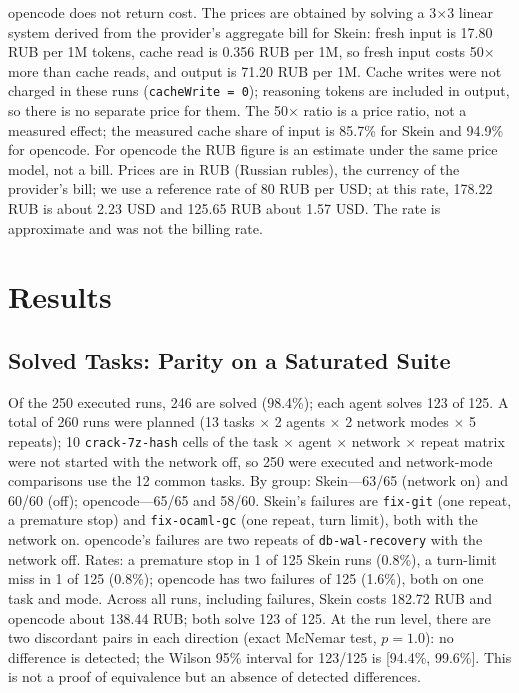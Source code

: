 \documentclass[11pt,a4paper]{article}
\begin{document}
opencode does not return cost. The prices are obtained by solving a 3$\times$3 linear system derived from the provider's
aggregate bill for Skein: fresh
input is 17.80 RUB per 1M tokens, cache read is 0.356 RUB per 1M, so fresh input costs 50$\times$ more than
cache reads, and output is 71.20 RUB per 1M. Cache writes were not charged in these runs
(\texttt{cacheWrite = 0}); reasoning tokens are included in output, so there is no separate
price for them. The 50$\times$ ratio is a price ratio, not a measured effect; the measured cache
share of input is 85.7\% for Skein and 94.9\% for opencode. For opencode the RUB figure is an
estimate under the same price model, not a bill. Prices are in RUB (Russian rubles), the
currency of the provider's bill; we use a reference rate of 80 RUB per USD; at this rate, 178.22 RUB is about
2.23 USD and 125.65 RUB about 1.57 USD. The rate is approximate and was not the billing rate.

\section{Results}

\subsection{Solved Tasks: Parity on a Saturated Suite}

Of the 250 executed runs, 246 are solved (98.4\%); each agent solves 123 of 125. A total of 260
runs were planned (13 tasks $\times$ 2 agents $\times$ 2 network modes $\times$ 5 repeats); 10
\texttt{crack-7z-hash} cells of the task $\times$ agent $\times$ network $\times$ repeat matrix
were not started with the network off, so 250 were executed and
network-mode comparisons use the 12 common tasks. By group: Skein---63/65 (network on) and 60/60
(off); opencode---65/65 and 58/60. Skein's failures are \texttt{fix-git} (one repeat, a
premature stop) and \texttt{fix-ocaml-gc} (one repeat, turn limit), both with the network on.
opencode's failures are two repeats of \texttt{db-wal-recovery} with the network off. Rates: a
premature stop in 1 of 125 Skein runs (0.8\%), a turn-limit miss in 1 of 125 (0.8\%); opencode
has two failures of 125 (1.6\%), both on one task and mode. Across all runs, including failures,
Skein costs 182.72 RUB and opencode about 138.44 RUB; both solve 123 of 125. At the run level,
there are two discordant pairs in each direction (exact McNemar test, $p=1.0$): no difference is detected; the
Wilson 95\% interval for 123/125 is [94.4\%, 99.6\%]. This is not a proof of equivalence but an
absence of detected differences.
\end{document}
